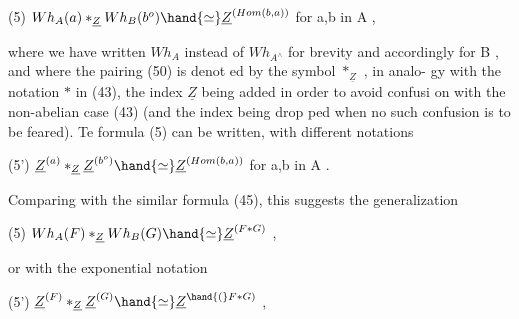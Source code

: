 (5) \qquad $Wh_A(a) *_{\underline{Z}} Wh_B(b^o) \hand{\simeq} \underline{Z}^{(Hom(b,a))}$ \qquad for a,b in A ,

where we have written $Wh_A$ instead of $Wh_{A^{\wedge}}$ for brevity and accordingly for
B , and where the pairing (50) is denot ed by the symbol $*_{\underline{Z}}$ , in analo-%
gy with the notation $*$ in (43), the index $\underline{Z}$ being added in order to
avoid confusi on with the non-abelian case (43) (and the index being drop\unsure{-}%
ped when no such confusion is to be feared). Te formula (5) can be
written, with different notations

(5') \qquad $\underline{Z}^{(a)} *_{\underline{Z}} \underline{Z}^{(b^o)} \hand{\simeq} \underline{Z}^{(Hom(b,a))}$ \qquad for a,b in A .

Comparing with the similar formula (45), this suggests the generalization

(5) \qquad $Wh_A(F) *_{\underline{Z}} Wh_B(G) \hand{\simeq} \underline{Z}^{(F*G)}$ \qquad ,

or with the exponential notation

(5') \qquad $\underline{Z}^{(F)} *_{\underline{Z}} \underline{Z}^{(G)} \hand{\simeq} \underline{Z}^{\hand{(}F*G)}$ \qquad ,

